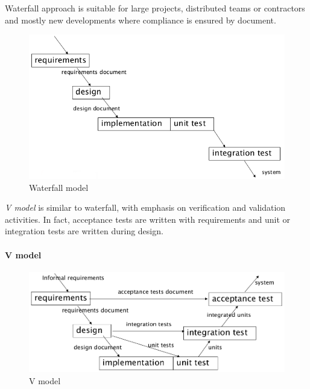 Waterfall approach is suitable for large projects, distributed teams or contractors and mostly new developments where compliance is ensured by document. 

\begin{figure}[hbtp]
\centering
\includegraphics[scale=0.3]{images/waterfall_model.png}
\caption{Waterfall model}
\end{figure}

\emph{V model} is similar to waterfall, with emphasis on verification and validation activities. In fact, acceptance tests are written with requirements and unit or integration tests are written during design.

\paragraph{V model}
\begin{figure}[hbtp]
\centering
\includegraphics[scale=0.3]{images/v_model.png}
\caption{V model}
\end{figure}

